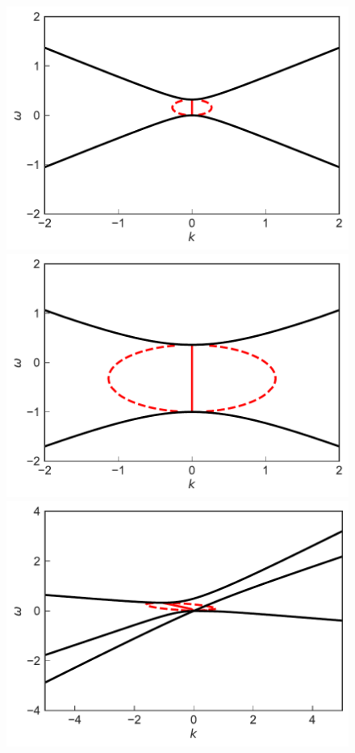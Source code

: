 \begin{figure}[!htb]
  \includegraphics[width=\linewidth]{chapters/assets/dr/spectDBWC1DRDBMAAPltBlob.pdf}
\endminipage\hfill
{}
  \includegraphics[width=\linewidth]{chapters/assets/dr/spectDBWC1DRDBMZAPltBlob.pdf}
\endminipage\hfill
\newline
{}
  \includegraphics[width=\linewidth]{chapters/assets/dr/spectDB3WC4DRDBMAAPltBlob.pdf}

\end{figure}
